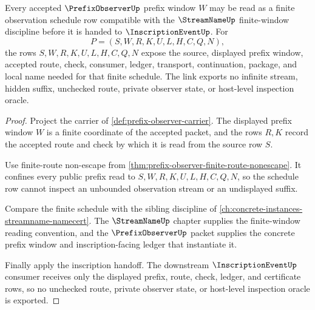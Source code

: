 \begin{theorem}
\label{thm:prefix-observer-streamname-schedule-link}
Every accepted $\PrefixObserverUp$ prefix window $W$ may be read as a finite observation schedule row compatible with the $\StreamNameUp$ finite-window discipline before it is handed to $\InscriptionEventUp$. For
$$
P=(S,W,R,K,U,L,H,C,Q,N),
$$
the rows $S,W,R,K,U,L,H,C,Q,N$ expose the source, displayed prefix window, accepted route, check, consumer, ledger, transport, continuation, package, and local name needed for that finite schedule. The link exports no infinite stream, hidden suffix, unchecked route, private observer state, or host-level inspection oracle.
\end{theorem}
\begin{proof}
Project the carrier of \autoref{def:prefix-observer-carrier}. The displayed prefix window $W$ is a finite coordinate of the accepted packet, and the rows $R,K$ record the accepted route and check by which it is read from the source row $S$.

Use finite-route non-escape from \autoref{thm:prefix-observer-finite-route-nonescape}. It confines every public prefix read to $S,W,R,K,U,L,H,C,Q,N$, so the schedule row cannot inspect an unbounded observation stream or an undisplayed suffix.

Compare the finite schedule with the sibling discipline of \autoref{ch:concrete-instances-streamname-namecert}. The $\StreamNameUp$ chapter supplies the finite-window reading convention, and the $\PrefixObserverUp$ packet supplies the concrete prefix window and inscription-facing ledger that instantiate it.

Finally apply the inscription handoff. The downstream $\InscriptionEventUp$ consumer receives only the displayed prefix, route, check, ledger, and certificate rows, so no unchecked route, private observer state, or host-level inspection oracle is exported.
\end{proof}


